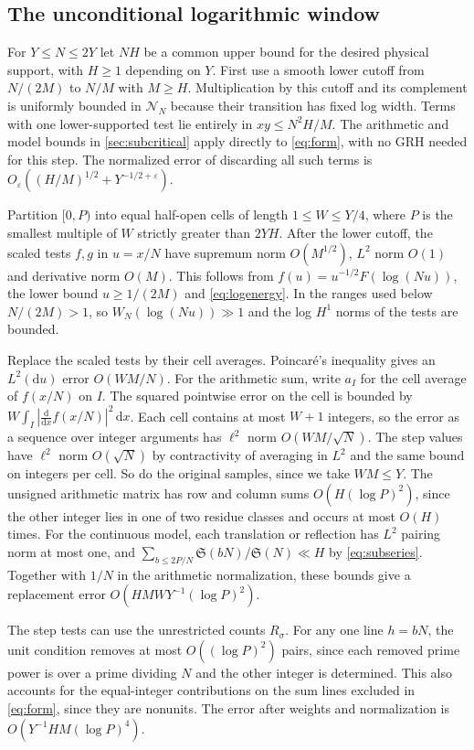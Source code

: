 \documentclass[11pt,a4paper]{article}
\numberwithin{equation}{section}
\newcommand{\SSS}{\mathfrak S}
\newcommand{\ud}{\mathrm d}
\newcommand{\NN}{\mathcal N_N}
\begin{document}
\subsection{The unconditional logarithmic window}

For $Y\le N\le 2Y$ let $NH$ be a common upper bound for the
desired physical support, with $H\ge1$ depending on $Y$.
First use a smooth lower cutoff from $N/(2M)$ to $N/M$ with
$M\ge H$. Multiplication by this cutoff and its complement
is uniformly bounded in $\NN$ because their transition has
fixed log width. Terms with one lower-supported test lie
entirely in $xy\le N^2H/M$. The arithmetic and model bounds
in \cref{sec:subcritical} apply directly to \cref{eq:form}, with no
GRH needed for this step. The normalized error of discarding all
such terms is $O_\varepsilon((H/M)^{1/2}+Y^{-1/2+\varepsilon})$.

Partition $[0,P)$ into equal half-open cells of length
$1\le W\le Y/4$, where $P$ is the smallest multiple of $W$
strictly greater than $2YH$. After the lower cutoff, the
scaled tests $f,g$ in $u=x/N$ have supremum norm
$O(M^{1/2})$, $L^2$ norm $O(1)$ and derivative norm $O(M)$.
This follows from $f(u)=u^{-1/2}F(\log(Nu))$, the lower bound
$u\ge1/(2M)$ and \cref{eq:logenergy}. In the ranges used below
$N/(2M)>1$, so $W_N(\log(Nu))\gg1$ and the log $H^1$ norms
of the tests are bounded.

Replace the scaled tests by their cell averages. Poincar\'e's
inequality gives an $L^2(\ud u)$ error $O(WM/N)$. For the
arithmetic sum, write $a_I$ for the cell average of $f(x/N)$
on $I$. The squared pointwise error on the cell is bounded
by $W\int_I|\frac{\ud}{\ud x}f(x/N)|^2\,\ud x$. Each cell
contains at most $W+1$ integers, so the error as a sequence
over integer arguments has $\ell^2$ norm $O(WM/\sqrt N)$.
The step values have $\ell^2$ norm $O(\sqrt N)$ by contractivity
of averaging in $L^2$ and the same bound on integers per cell.
So do the original samples, since we take $WM\le Y$.
The unsigned arithmetic matrix has row and column sums
$O(H(\log P)^2)$, since the other integer lies in one of
two residue classes and occurs at most $O(H)$ times.
For the continuous model, each translation or reflection has
$L^2$ pairing norm at most one, and
$\sum_{b\le 2P/N}\SSS(bN)/\SSS(N)\ll H$ by \cref{eq:subseries}.
Together with $1/N$ in the arithmetic normalization, these
bounds give a replacement error $O(HMW Y^{-1}(\log P)^2)$.

The step tests can use the unrestricted counts $R_\sigma$.
For any one line $h=bN$, the unit condition removes at most
$O((\log P)^2)$ pairs, since each removed prime power is over a
prime dividing $N$ and the other integer is determined. This
also accounts for the equal-integer contributions on the sum
lines excluded in \cref{eq:form}, since they are nonunits.
The error after weights and normalization is
$O(Y^{-1} H M(\log P)^4)$.
\end{document}
